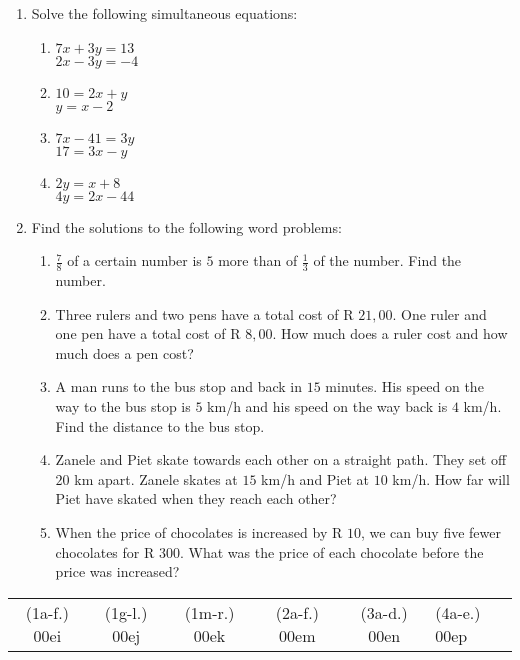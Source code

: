 \begin{eocexercises}{}
\begin{enumerate}[itemsep=5pt, label=\textbf{\arabic*}. ]
\item Solve the following simultaneous equations:
\begin{enumerate}[itemsep=5pt,label=\textbf{(\alph*)}]
\item $7x+3y=13$\\$2x-3y=-4$  
\item $10=2x+y$\\$y=x-2$
\item $7x-41=3y$\\$17=3x-y$
\item $2y=x+8$\\$4y=2x-44$
\end{enumerate}

\item Find the solutions to the following word problems:
\begin{enumerate}[itemsep=5pt,label=\textbf{(\alph*)}]
\item $\frac{7}{8}$ of a certain number is $5$ more than of $\frac{1}{3}$ of the number. Find the number.
\item Three rulers and two pens have a total cost of R $21,00$. One ruler and one pen have a total cost of R $8,00$. How much does a ruler cost and how much does a pen cost? 
\item A man runs to the bus stop and back in $15$ minutes. His speed on the way to the bus stop is $5$ km/h and his speed on the way back is $4$ km/h. Find the distance to the bus stop.
\item Zanele and Piet skate towards each other on a straight path. They set off $20$ km apart. Zanele skates at $15$ km/h and Piet at $10$ km/h. How far will Piet have skated when they reach each other?
\item When the price of chocolates is increased by R $10$, we can buy five fewer chocolates for R $300$. What was the price of each chocolate before the price was increased?
   

\end{enumerate}
\end{enumerate}
\practiceinfo
\par 
\par \begin{tabular}[h]{ccccc} 
(1a-f.) 00ei&  (1g-l.) 00ej& (1m-r.) 00ek&  (2a-f.) 00em&  (3a-d.) 00en&  (4a-e.) 00ep\end{tabular}

\end{eocexercises}
